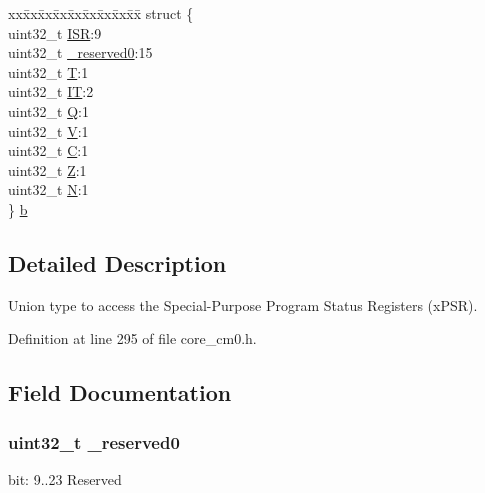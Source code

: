\begin{DoxyCompactItemize}
\begin{tabbing}
\end{tabbing}\item 
\begin{tabbing}
xx\=xx\=xx\=xx\=xx\=xx\=xx\=xx\=xx\=\kill
struct \{\\
\>uint32\_t \hyperlink{unionx_p_s_r___type_ad502ba7dbb2aab5f87c782b28f02622d}{ISR}:9\\
\>uint32\_t \hyperlink{unionx_p_s_r___type_ac8a6a13838a897c8d0b8bc991bbaf7c1}{\_reserved0}:15\\
\>uint32\_t \hyperlink{unionx_p_s_r___type_a6e1cf12e53a20224f6f62c001d9be972}{T}:1\\
\>uint32\_t \hyperlink{unionx_p_s_r___type_a76485660fe8ad98cdc71ddd7cb0ed777}{IT}:2\\
\>uint32\_t \hyperlink{unionx_p_s_r___type_a65f27ddc4f7e09c14ce7c5211b2e000a}{Q}:1\\
\>uint32\_t \hyperlink{unionx_p_s_r___type_acd4a2b64faee91e4a9eef300667fa222}{V}:1\\
\>uint32\_t \hyperlink{unionx_p_s_r___type_a7a1caf92f32fe9ebd8d1fe89b06c7776}{C}:1\\
\>uint32\_t \hyperlink{unionx_p_s_r___type_a5ae954cbd9986cd64625d7fa00943c8e}{Z}:1\\
\>uint32\_t \hyperlink{unionx_p_s_r___type_abae0610bc2a97bbf7f689e953e0b451f}{N}:1\\
\} \hyperlink{unionx_p_s_r___type_a4ff200ad9067d3d0864a8465a92eb7d6}{b}\\

\end{tabbing}\end{DoxyCompactItemize}


\subsection{Detailed Description}
Union type to access the Special-\/\+Purpose Program Status Registers (x\+P\+SR). 

Definition at line 295 of file core\+\_\+cm0.\+h.



\subsection{Field Documentation}
\subsubsection[{\texorpdfstring{\+\_\+reserved0}{_reserved0}}]{\setlength{\rightskip}{0pt plus 5cm}uint32\+\_\+t \+\_\+reserved0}\hypertarget{unionx_p_s_r___type_ac8a6a13838a897c8d0b8bc991bbaf7c1}{}\label{unionx_p_s_r___type_ac8a6a13838a897c8d0b8bc991bbaf7c1}
bit\+: 9..23 Reserved

